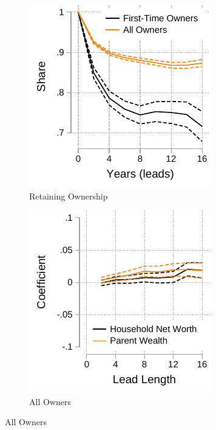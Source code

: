 \documentclass[12pt]{article}
\begin{document}
\begin{figure}[tb]
	\captionsetup[subfigure]{aboveskip=-1pt}
	\caption{Retaining Homeownership}\label{fig:homeowner_exit}
	\begin{subfigure}{0.33\textwidth}%
		\caption{Retaining Ownership}\label{fig:owner_hazard}%
		\includegraphics[width=\textwidth]{../tabfig/descr/PSID_ownerexit.pdf}%
	\end{subfigure}%
	\hfill
	\begin{subfigure}{0.33\textwidth}%
		\caption{All Owners}\label{fig:coef_allowner}%
		\includegraphics[width=\textwidth]{../tabfig/descr/PSID_coefowner.pdf}%

\end{subfigure}
\end{figure}
\end{document}
